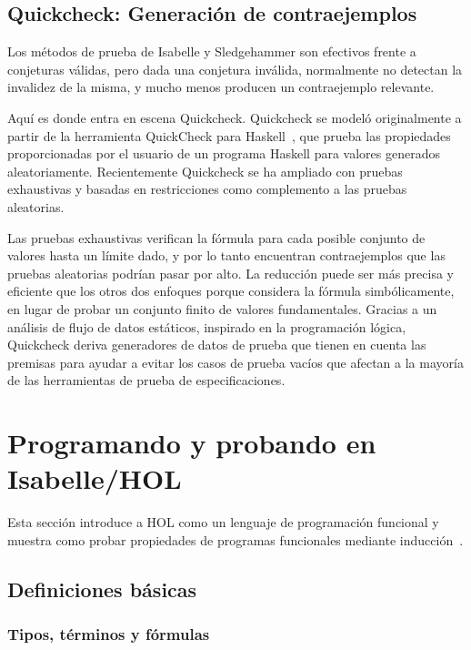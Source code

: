 \documentclass[12pt]{book}
\begin{document}
\subsection{Quickcheck: Generación de contraejemplos}

Los métodos de prueba de Isabelle y Sledgehammer son efectivos frente a conjeturas válidas, pero dada una conjetura inválida, normalmente no detectan la invalidez de la misma, y mucho menos producen un contraejemplo relevante.

Aquí es donde entra en escena Quickcheck. Quickcheck se modeló originalmente a partir de la herramienta QuickCheck para Haskell~\cite{quickcheck_haskell}, que prueba las propiedades proporcionadas por el usuario de un programa Haskell para valores generados aleatoriamente. Recientemente Quickcheck se ha ampliado con pruebas exhaustivas y basadas en restricciones como complemento a las pruebas aleatorias.

Las pruebas exhaustivas verifican la fórmula para cada posible conjunto de valores hasta un límite dado, y por lo tanto encuentran contraejemplos que las pruebas aleatorias podrían pasar por alto. La reducción puede ser más precisa y eficiente que los otros dos enfoques porque considera la fórmula simbólicamente, en lugar de probar un conjunto finito de valores fundamentales. Gracias a un análisis de flujo de datos estáticos, inspirado en la programación lógica, Quickcheck deriva generadores de datos de prueba que tienen en cuenta las premisas para ayudar a evitar los casos de prueba vacíos que afectan a la mayoría de las herramientas de prueba de especificaciones.


\section{Programando y probando en Isabelle/HOL}

Esta sección introduce a HOL como un lenguaje de programación funcional y muestra como probar propiedades de programas funcionales mediante inducción~\cite{prog-prove-isabelle}.

\subsection{Definiciones básicas}

\subsubsection{Tipos, términos y fórmulas}
\end{document}
